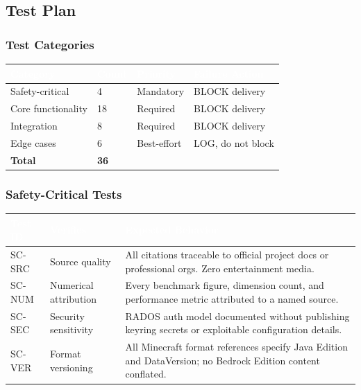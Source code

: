 \documentclass[11pt,letterpaper]{article}
\newcommand{\tableheader}[1]{\textbf{\sffamily\textcolor{white}{#1}}}
\begin{document}
\subsection{Test Plan}

\subsubsection{Test Categories}

\begin{center}
\begin{tabularx}{\textwidth}{L{3.5cm}C{1.5cm}L{2cm}X}
\toprule
{}
\tableheader{Category} & \tableheader{Count} & \tableheader{Priority} & \tableheader{Failure Action} \\
\midrule
Safety-critical & 4 & Mandatory & BLOCK delivery \\
Core functionality & 18 & Required & BLOCK delivery \\
Integration & 8 & Required & BLOCK delivery \\
Edge cases & 6 & Best-effort & LOG, do not block \\
\midrule
\textbf{Total} & \textbf{36} & & \\
\bottomrule
\end{tabularx}
\end{center}

\subsubsection{Safety-Critical Tests}

\begin{center}
\begin{tabularx}{\textwidth}{L{1.5cm}L{3.5cm}X}
\toprule
{}
\tableheader{Test ID} & \tableheader{Verifies} & \tableheader{Expected Behavior} \\
\midrule
SC-SRC & Source quality & All citations traceable to official project docs or professional orgs. Zero entertainment media. \\
SC-NUM & Numerical attribution & Every benchmark figure, dimension count, and performance metric attributed to a named source. \\
SC-SEC & Security sensitivity & RADOS auth model documented without publishing keyring secrets or exploitable configuration details. \\
SC-VER & Format versioning & All Minecraft format references specify Java Edition and DataVersion; no Bedrock Edition content conflated. \\
\bottomrule
\end{tabularx}
\end{center}
\end{document}
